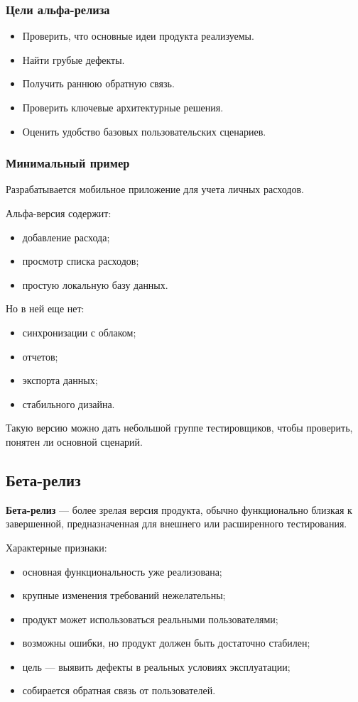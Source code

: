 \documentclass[12pt,a4paper]{article}
\begin{document}
\subsubsection{Цели альфа-релиза}

\begin{itemize}
    \item Проверить, что основные идеи продукта реализуемы.
    \item Найти грубые дефекты.
    \item Получить раннюю обратную связь.
    \item Проверить ключевые архитектурные решения.
    \item Оценить удобство базовых пользовательских сценариев.
\end{itemize}

\subsubsection{Минимальный пример}

Разрабатывается мобильное приложение для учета личных расходов.

Альфа-версия содержит:
\begin{itemize}
    \item добавление расхода;
    \item просмотр списка расходов;
    \item простую локальную базу данных.
\end{itemize}

Но в ней еще нет:
\begin{itemize}
    \item синхронизации с облаком;
    \item отчетов;
    \item экспорта данных;
    \item стабильного дизайна.
\end{itemize}

Такую версию можно дать небольшой группе тестировщиков, чтобы проверить, понятен ли основной сценарий.

\subsection{Бета-релиз}

\textbf{Бета-релиз} --- более зрелая версия продукта, обычно функционально близкая к завершенной, предназначенная для внешнего или расширенного тестирования.

Характерные признаки:
\begin{itemize}
    \item основная функциональность уже реализована;
    \item крупные изменения требований нежелательны;
    \item продукт может использоваться реальными пользователями;
    \item возможны ошибки, но продукт должен быть достаточно стабилен;
    \item цель --- выявить дефекты в реальных условиях эксплуатации;
    \item собирается обратная связь от пользователей.
\end{itemize}
\end{document}

